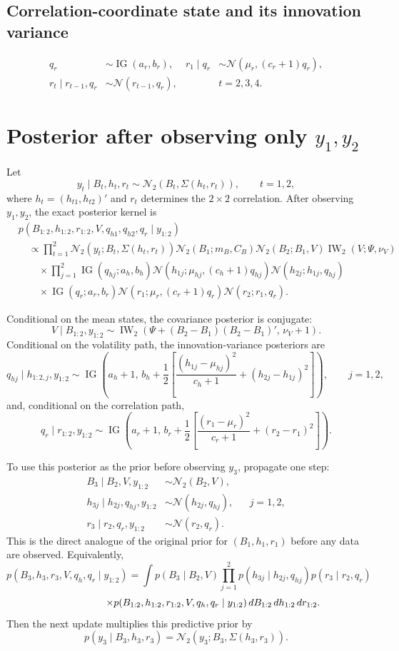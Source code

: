 \documentclass[10pt,a4paper]{article}
\newcommand{\N}{\mathcal N}
\newcommand{\IG}{\operatorname{IG}}
\newcommand{\IW}{\operatorname{IW}}
\begin{document}
\subsection*{Correlation-coordinate state and its innovation variance}

\begin{align*}
q_r &\sim \IG(a_r,b_r),
& r_1\mid q_r &\sim \N\!\left(\mu_r,(c_r+1)q_r\right),\\
r_t\mid r_{t-1},q_r
  &\sim \N(r_{t-1},q_r),
&& t=2,3,4.
\end{align*}

\section*{Posterior after observing only $y_1,y_2$}

Let
\[
  y_t\mid B_t,h_t,r_t\sim \N_2\!\left(B_t,\Sigma(h_t,r_t)\right),
  \qquad t=1,2,
\]
where $h_t=(h_{t1},h_{t2})'$ and $r_t$ determines the $2\times2$ correlation.
After observing $y_1,y_2$, the exact posterior kernel is
\begin{align*}
&p(B_{1:2},h_{1:2},r_{1:2},V,q_{h1},q_{h2},q_r\mid y_{1:2})\\
&\quad\propto
\prod_{t=1}^2\N_2\!\left(y_t;B_t,\Sigma(h_t,r_t)\right)
\N_2(B_1;m_B,C_B)\N_2(B_2;B_1,V)\IW_2(V;\Psi,\nu_V)\\
&\qquad{}\times
\prod_{j=1}^2
\IG(q_{hj};a_h,b_h)
\N\!\left(h_{1j};\mu_{hj},(c_h+1)q_{hj}\right)
\N(h_{2j};h_{1j},q_{hj})\\
&\qquad{}\times
\IG(q_r;a_r,b_r)
\N\!\left(r_1;\mu_r,(c_r+1)q_r\right)
\N(r_2;r_1,q_r).
\end{align*}

Conditional on the mean states, the covariance posterior is conjugate:
\[
  V\mid B_{1:2},y_{1:2}
  \sim \IW_2\!\left(\Psi+(B_2-B_1)(B_2-B_1)',\,\nu_V+1\right).
\]
Conditional on the volatility path, the innovation-variance posteriors are
\[
q_{hj}\mid h_{1:2,j},y_{1:2}
\sim
\IG\!\left(a_h+1,\,
b_h+\frac12\left[
\frac{(h_{1j}-\mu_{hj})^2}{c_h+1}
+(h_{2j}-h_{1j})^2
\right]\right),
\qquad j=1,2,
\]
and, conditional on the correlation path,
\[
q_r\mid r_{1:2},y_{1:2}
\sim
\IG\!\left(a_r+1,\,
b_r+\frac12\left[
\frac{(r_1-\mu_r)^2}{c_r+1}
+(r_2-r_1)^2
\right]\right).
\]

To use this posterior as the prior before observing $y_3$, propagate one step:
\begin{align*}
B_3\mid B_2,V,y_{1:2} &\sim \N_2(B_2,V),\\
h_{3j}\mid h_{2j},q_{hj},y_{1:2} &\sim \N(h_{2j},q_{hj}),
&& j=1,2,\\
r_3\mid r_2,q_r,y_{1:2} &\sim \N(r_2,q_r).
\end{align*}
This is the direct analogue of the original prior for
$(B_1,h_1,r_1)$ before any data are observed. Equivalently,
\[
p(B_3,h_3,r_3,V,q_h,q_r\mid y_{1:2})
=\int p(B_3\mid B_2,V)
\prod_{j=1}^2p(h_{3j}\mid h_{2j},q_{hj})
p(r_3\mid r_2,q_r)
\]
\[
\hspace{19mm}\times
p(B_{1:2},h_{1:2},r_{1:2},V,q_h,q_r\mid y_{1:2})\,
dB_{1:2}\,dh_{1:2}\,dr_{1:2}.
\]
Then the next update multiplies this predictive prior by
\[
  p(y_3\mid B_3,h_3,r_3)
  =\N_2\!\left(y_3;B_3,\Sigma(h_3,r_3)\right).
\]
\end{document}
